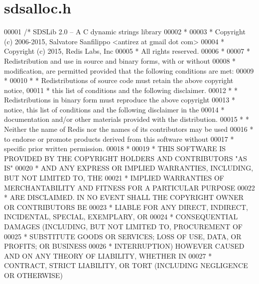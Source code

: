 \hypertarget{sdsalloc_8h_source}{}\section{sdsalloc.\+h}
\label{sdsalloc_8h_source}

\begin{DoxyCode}
00001 \textcolor{comment}{/* SDSLib 2.0 -- A C dynamic strings library}
00002 \textcolor{comment}{ *}
00003 \textcolor{comment}{ * Copyright (c) 2006-2015, Salvatore Sanfilippo <antirez at gmail dot com>}
00004 \textcolor{comment}{ * Copyright (c) 2015, Redis Labs, Inc}
00005 \textcolor{comment}{ * All rights reserved.}
00006 \textcolor{comment}{ *}
00007 \textcolor{comment}{ * Redistribution and use in source and binary forms, with or without}
00008 \textcolor{comment}{ * modification, are permitted provided that the following conditions are met:}
00009 \textcolor{comment}{ *}
00010 \textcolor{comment}{ *   * Redistributions of source code must retain the above copyright notice,}
00011 \textcolor{comment}{ *     this list of conditions and the following disclaimer.}
00012 \textcolor{comment}{ *   * Redistributions in binary form must reproduce the above copyright}
00013 \textcolor{comment}{ *     notice, this list of conditions and the following disclaimer in the}
00014 \textcolor{comment}{ *     documentation and/or other materials provided with the distribution.}
00015 \textcolor{comment}{ *   * Neither the name of Redis nor the names of its contributors may be used}
00016 \textcolor{comment}{ *     to endorse or promote products derived from this software without}
00017 \textcolor{comment}{ *     specific prior written permission.}
00018 \textcolor{comment}{ *}
00019 \textcolor{comment}{ * THIS SOFTWARE IS PROVIDED BY THE COPYRIGHT HOLDERS AND CONTRIBUTORS "AS IS"}
00020 \textcolor{comment}{ * AND ANY EXPRESS OR IMPLIED WARRANTIES, INCLUDING, BUT NOT LIMITED TO, THE}
00021 \textcolor{comment}{ * IMPLIED WARRANTIES OF MERCHANTABILITY AND FITNESS FOR A PARTICULAR PURPOSE}
00022 \textcolor{comment}{ * ARE DISCLAIMED. IN NO EVENT SHALL THE COPYRIGHT OWNER OR CONTRIBUTORS BE}
00023 \textcolor{comment}{ * LIABLE FOR ANY DIRECT, INDIRECT, INCIDENTAL, SPECIAL, EXEMPLARY, OR}
00024 \textcolor{comment}{ * CONSEQUENTIAL DAMAGES (INCLUDING, BUT NOT LIMITED TO, PROCUREMENT OF}
00025 \textcolor{comment}{ * SUBSTITUTE GOODS OR SERVICES; LOSS OF USE, DATA, OR PROFITS; OR BUSINESS}
00026 \textcolor{comment}{ * INTERRUPTION) HOWEVER CAUSED AND ON ANY THEORY OF LIABILITY, WHETHER IN}
00027 \textcolor{comment}{ * CONTRACT, STRICT LIABILITY, OR TORT (INCLUDING NEGLIGENCE OR OTHERWISE)}

\end{DoxyCode}
